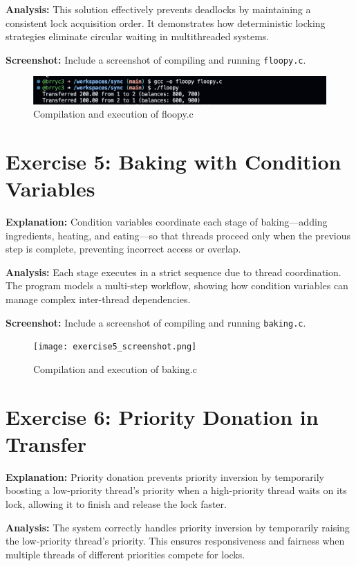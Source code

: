 \documentclass{article}
\begin{document}
\textbf{Analysis:} This solution effectively prevents deadlocks by maintaining a consistent lock acquisition order. It demonstrates how deterministic locking strategies eliminate circular waiting in multithreaded systems.

\textbf{Screenshot:} Include a screenshot of compiling and running \texttt{floopy.c}.
\begin{figure}[h]
\centering
\includegraphics[width=\textwidth]{exercise4_screenshot.png}
\caption{Compilation and execution of floopy.c}
\end{figure}

\section{Exercise 5: Baking with Condition Variables}


\textbf{Explanation:} Condition variables coordinate each stage of baking—adding ingredients, heating, and eating—so that threads proceed only when the previous step is complete, preventing incorrect access or overlap.

\textbf{Analysis:} Each stage executes in a strict sequence due to thread coordination. The program models a multi-step workflow, showing how condition variables can manage complex inter-thread dependencies.

\textbf{Screenshot:} Include a screenshot of compiling and running \texttt{baking.c}.
\begin{figure}[h]
\centering
\texttt{[image: exercise5\_screenshot.png]}
\caption{Compilation and execution of baking.c}
\end{figure}

\section{Exercise 6: Priority Donation in Transfer}


\textbf{Explanation:} Priority donation prevents priority inversion by temporarily boosting a low-priority thread’s priority when a high-priority thread waits on its lock, allowing it to finish and release the lock faster.

\textbf{Analysis:} The system correctly handles priority inversion by temporarily raising the low-priority thread’s priority. This ensures responsiveness and fairness when multiple threads of different priorities compete for locks.
\end{document}
